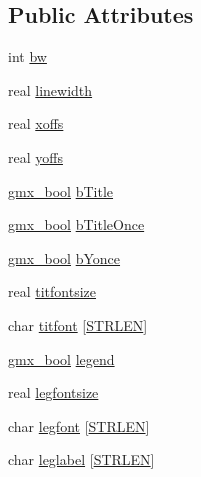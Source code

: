 \subsection*{\-Public \-Attributes}
\begin{DoxyCompactItemize}
\item 
int \hyperlink{structt__psrec_aa68e14d942a32a55ed8462479616160c}{bw}
\item 
real \hyperlink{structt__psrec_a8c6ba53f5127636ae1018165b58e8fd4}{linewidth}
\item 
real \hyperlink{structt__psrec_aa1538adb1d83656c2b93a03e1ad64ab0}{xoffs}
\item 
real \hyperlink{structt__psrec_aec66c866e293aaf4825facb757c405b3}{yoffs}
\item 
\hyperlink{include_2types_2simple_8h_a8fddad319f226e856400d190198d5151}{gmx\-\_\-bool} \hyperlink{structt__psrec_a3c06586ca7c50521a46f7e0d9c65175c}{b\-Title}
\item 
\hyperlink{include_2types_2simple_8h_a8fddad319f226e856400d190198d5151}{gmx\-\_\-bool} \hyperlink{structt__psrec_aeca0912cf28236e8563f0fa8243b85b2}{b\-Title\-Once}
\item 
\hyperlink{include_2types_2simple_8h_a8fddad319f226e856400d190198d5151}{gmx\-\_\-bool} \hyperlink{structt__psrec_acd493ad1e01f5b7888c04920fa652c96}{b\-Yonce}
\item 
real \hyperlink{structt__psrec_a9b1bdcd98d88c9d04d86081989d7adcd}{titfontsize}
\item 
char \hyperlink{structt__psrec_a4575884e68323300f0b9bb900bac3759}{titfont} \mbox{[}\hyperlink{share_2template_2gromacs_2types_2simple_8h_a278cf415676752815cfb411cb0b32802}{\-S\-T\-R\-L\-E\-N}\mbox{]}
\item 
\hyperlink{include_2types_2simple_8h_a8fddad319f226e856400d190198d5151}{gmx\-\_\-bool} \hyperlink{structt__psrec_aa47f46814ee50bbfc2cc188db157e269}{legend}
\item 
real \hyperlink{structt__psrec_a046aa25072f2f7d7b80445bbe8c888ba}{legfontsize}
\item 
char \hyperlink{structt__psrec_ab1528bce9a3c164149135ebe85f9d86e}{legfont} \mbox{[}\hyperlink{share_2template_2gromacs_2types_2simple_8h_a278cf415676752815cfb411cb0b32802}{\-S\-T\-R\-L\-E\-N}\mbox{]}
\item 
char \hyperlink{structt__psrec_a7b1b48af7339bc4f049339db73e1c0de}{leglabel} \mbox{[}\hyperlink{share_2template_2gromacs_2types_2simple_8h_a278cf415676752815cfb411cb0b32802}{\-S\-T\-R\-L\-E\-N}\mbox{]}
\item 

\end{DoxyCompactItemize}
